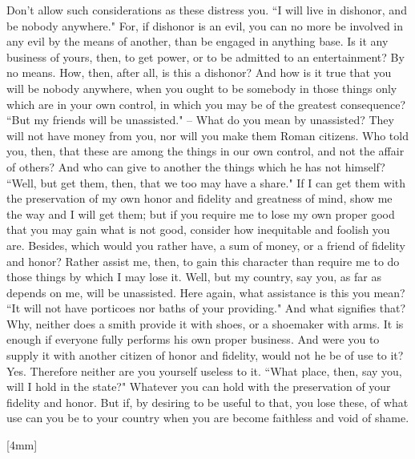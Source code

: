 \documentclass[a4paper,12pt]{book}
\newcounter{original_page_count}
\newcommand{\margincounter}{
    \stepcounter{original_page_count}
    \marginnote{
        \color{red}
        \small{
            \roman{original_page_count}
        }
    }[4mm]
}
\begin{document}
Don't allow such considerations as these distress you. ``I will
live in dishonor, and be nobody anywhere." For, if dishonor is an
evil, you can no more be involved in any evil by the means of another,
than be engaged in anything base. Is it any business of yours, then,
to get power, or to be admitted to an entertainment? By no means.
How, then, after all, is this a dishonor? And how is it true that
you will be nobody anywhere, when you ought to be somebody in those
things only which are in your own control, in which you may be of
the greatest consequence? ``But my friends will be unassisted." --
What do you mean by unassisted? They will not have money from you,
nor will you make them Roman citizens. Who told you, then, that these
are among the things in our own control, and not the affair of others?
And who can give to another the things which he has not himself? ``Well,
but get them, then, that we too may have a share." If I can get them
with the preservation of my own honor and fidelity and greatness of
mind, show me the way and I will get them; but if you require me to
lose my own proper good that you may gain what is not good, consider
how inequitable and foolish you are. Besides, which would you rather
have, a sum of money, or a friend of fidelity and honor? Rather assist
me, then, to gain this character than require me to do those things
by which I may lose it. Well, but my country, say you, as far as depends
on me, will be unassisted. Here again, what assistance is this you
mean? ``It will not have porticoes nor baths of your providing." And
what signifies that? Why, neither does a smith provide it with shoes,
or a shoemaker with arms. It is enough if everyone fully performs
his own proper business. And were you to supply it with another citizen
of honor and fidelity, would not he be of use to it? Yes. Therefore
neither are you yourself useless to it. ``What place, then, say you,
will I hold in the state?" Whatever you can hold with the preservation
of your fidelity and honor. But if, by desiring to be useful to that,
you lose these, of what use can you be to your country when you are
become faithless and void of shame. 

\margincounter{}
\end{document}
